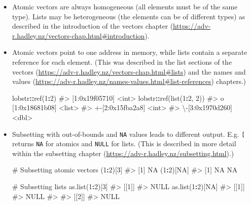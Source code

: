 \documentclass[
]{krantz}
\makeatletter
\newenvironment{Shaded}{\begin{snugshade}}{\end{snugshade}}
\newcommand{\CommentTok}[1]{\textcolor[rgb]{0.56,0.35,0.01}{\textit{#1}}}
\newcommand{\DecValTok}[1]{\textcolor[rgb]{0.00,0.00,0.81}{#1}}
\newcommand{\KeywordTok}[1]{\textcolor[rgb]{0.13,0.29,0.53}{\textbf{#1}}}
\newcommand{\NormalTok}[1]{#1}
\newcommand{\OperatorTok}[1]{\textcolor[rgb]{0.81,0.36,0.00}{\textbf{#1}}}
\newcommand{\OtherTok}[1]{\textcolor[rgb]{0.56,0.35,0.01}{#1}}
\renewcommand{\href}[2]{#2 (\url{#1})}
\newenvironment{kframe}{%
\medskip{}
\setlength{\fboxsep}{.8em}
 \def\at@end@of@kframe{}%
 \ifinner\ifhmode%
  \def\at@end@of@kframe{\end{minipage}}%
  \begin{minipage}{\columnwidth}%
 \fi\fi%
 \def\FrameCommand##1{\hskip\@totalleftmargin \hskip-\fboxsep
 \colorbox{shadecolor}{##1}\hskip-\fboxsep
     \hskip-\linewidth \hskip-\@totalleftmargin \hskip\columnwidth}%
 \MakeFramed {\advance\hsize-\width
   \@totalleftmargin\z@ \linewidth\hsize
   \@setminipage}}%
 {\par\unskip\endMakeFramed%
 \at@end@of@kframe}
\renewenvironment{Shaded}{\begin{kframe}}{\end{kframe}}
\renewcommand{\KeywordTok} [1]{\textcolor[rgb]{0.00,0.44,0.13}{{#1}}}
\renewcommand{\DecValTok}  [1]{\textcolor[rgb]{0.25,0.63,0.44}{{#1}}}
\renewcommand{\CommentTok} [1]{\textcolor[rgb]{0.38,0.63,0.69}{{#1}}}
\renewcommand{\OtherTok}   [1]{\textcolor[rgb]{0.00,0.44,0.13}{{#1}}}
\renewcommand{\NormalTok}  [1]{{#1}}
\makeatother
\begin{document}
\begin{itemize}
\item
  Atomic vectors are always homogeneous (all elements must be of the same type). Lists may be heterogeneous (the elements can be of different types) as described in the \href{https://adv-r.hadley.nz/vectors-chap.html\#introduction}{introduction of the vectors chapter}.
\item
  Atomic vectors point to one address in memory, while lists contain a separate reference for each element. (This was described in the list sections of the \href{https://adv-r.hadley.nz/vectors-chap.html\#lists}{vectors} and the \href{https://adv-r.hadley.nz/names-values.html\#list-references}{names and values} chapters.)

\begin{Shaded}
\begin{Highlighting}[]
\NormalTok{lobstr}\OperatorTok{::}\KeywordTok{ref}\NormalTok{(}\DecValTok{1}\OperatorTok{:}\DecValTok{2}\NormalTok{)}
\CommentTok{#> [1:0x19f05710] <int>}
\NormalTok{lobstr}\OperatorTok{::}\KeywordTok{ref}\NormalTok{(}\KeywordTok{list}\NormalTok{(}\DecValTok{1}\OperatorTok{:}\DecValTok{2}\NormalTok{, }\DecValTok{2}\NormalTok{))}
\CommentTok{#> o [1:0x18681b08] <list> }
\CommentTok{#> +-[2:0x15fba2a8] <int> }
\CommentTok{#> \textbackslash{}-[3:0x1970d260] <dbl>}
\end{Highlighting}
\end{Shaded}
\item
  Subsetting with out-of-bounds and \texttt{NA} values leads to different output. E.g. \texttt{{[}} returns \texttt{NA} for atomics and \texttt{NULL} for lists. (This is described in more detail within the \href{https://adv-r.hadley.nz/subsetting.html}{subsetting chapter}.)

\begin{Shaded}
\begin{Highlighting}[]
\CommentTok{# Subsetting atomic vectors}
\NormalTok{(}\DecValTok{1}\OperatorTok{:}\DecValTok{2}\NormalTok{)[}\DecValTok{3}\NormalTok{]}
\CommentTok{#> [1] NA}
\NormalTok{(}\DecValTok{1}\OperatorTok{:}\DecValTok{2}\NormalTok{)[}\OtherTok{NA}\NormalTok{]}
\CommentTok{#> [1] NA NA}

\CommentTok{# Subsetting lists}
\KeywordTok{as.list}\NormalTok{(}\DecValTok{1}\OperatorTok{:}\DecValTok{2}\NormalTok{)[}\DecValTok{3}\NormalTok{]}
\CommentTok{#> [[1]]}
\CommentTok{#> NULL}
\KeywordTok{as.list}\NormalTok{(}\DecValTok{1}\OperatorTok{:}\DecValTok{2}\NormalTok{)[}\OtherTok{NA}\NormalTok{]}
\CommentTok{#> [[1]]}
\CommentTok{#> NULL}
\CommentTok{#> }
\CommentTok{#> [[2]]}
\CommentTok{#> NULL}
\end{Highlighting}
\end{Shaded}
\end{itemize}
\end{document}
